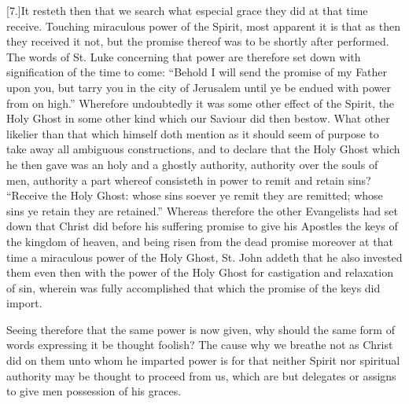 [7.]It resteth then that we search what especial grace they did at that time receive. Touching miraculous power of the Spirit, most apparent it is that as then they received it not, but the promise thereof was to be shortly after performed. The words of St. Luke concerning that power are therefore set down with signification of the time to come: “Behold I will send the promise of my Father upon you, but tarry you in the city of Jerusalem until ye be endued with power from on high.” Wherefore undoubtedly it was some other effect of the Spirit, the Holy Ghost in some other kind which our Saviour did then bestow. What other likelier than that which himself doth mention as it should seem of purpose to take away all ambiguous constructions, and to declare that the Holy Ghost which he then gave was an holy and a ghostly authority, authority over the souls of men, authority a part whereof consisteth in power to remit and retain sins? “Receive the Holy Ghost: whose sins soever ye remit they are remitted; whose sins ye retain they are retained.” Whereas therefore the other Evangelists had set down that Christ did before his suffering promise to give his Apostles the keys of the kingdom of heaven, and being risen from the dead promise moreover at that time a miraculous power of the Holy Ghost, St. John addeth that he also invested them even then with the power of the Holy Ghost for castigation and relaxation of sin, wherein was fully accomplished that which the promise of the keys did import.

Seeing therefore that the same power is now given, why should the same form of words expressing it be thought foolish? The cause why we breathe not as Christ did on them unto whom he imparted power is for that neither Spirit nor spiritual authority may be thought to proceed from us,  which are but delegates or assigns to give men possession of his graces.

